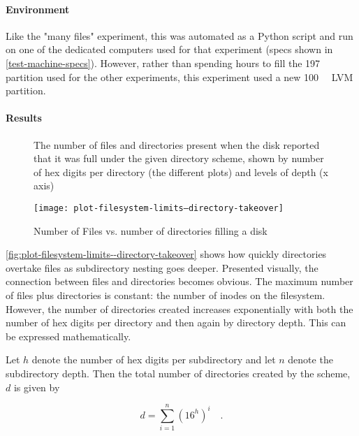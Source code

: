 \paragraph{Environment}

Like the "many files" experiment, this was automated as a Python script and run
on one of the dedicated computers used for that experiment (specs shown in
\autoref{test-machine-specs}). However, rather than spending hours to fill the
\SI{197}{\gibi\byte} partition used for the other experiments, this experiment
used a new \SI{100}{\mebi\byte} LVM partition.

\paragraph{Results}
\label{seek-times-results}

\begin{figure}[]
    \caption{Number of Files vs. number of directories filling a disk}
    \label{fig:plot-filesystem-limits--directory-takeover}
    \centering

    The number of files and directories present when the disk reported that it
    was full under the given directory scheme, shown by number of hex digits per
    directory (the different plots) and levels of depth (x axis)

    \texttt{[image: plot-filesystem-limits--directory-takeover]}
\end{figure}


\autoref{fig:plot-filesystem-limits--directory-takeover} shows how quickly
directories overtake files as subdirectory nesting goes deeper. Presented
visually, the connection between files and directories becomes obvious. The
maximum number of files plus directories is constant: the number of inodes on
the filesystem. However, the number of directories created increases
exponentially with both the number of hex digits per directory and then again by
directory depth. This can be expressed mathematically.

Let $h$ denote the number of hex digits per subdirectory and let $n$ denote the
subdirectory depth. Then the total number of directories created by the scheme,
$d$ is given by

\begin{equation}
    d = \sum_{i=1}^n \left( 16^h \right)^i \quad.
\end{equation}

